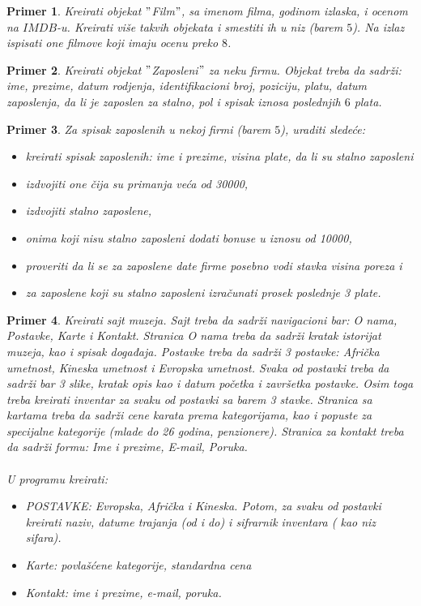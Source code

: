\documentclass[a4paper]{article}
\newtheorem{primer}{Primer}[section]
\begin{document}
\begin{primer}
Kreirati objekat $"$Film$"$, sa imenom filma, godinom izlaska, i ocenom na $IMDB$-u. Kreirati više takvih objekata i smestiti ih u niz (barem $5$). Na izlaz ispisati one filmove koji imaju ocenu preko $8$.  
\end{primer}

\begin{primer}
Kreirati objekat $"$Zaposleni$"$ za neku firmu. Objekat treba da sadrži: ime, prezime, datum rodjenja, identifikacioni broj, poziciju, platu, datum zaposlenja, da li je zaposlen za stalno, pol i spisak iznosa poslednjih $6$ plata.
\end{primer}

\begin{primer}
Za spisak zaposlenih u nekoj firmi (barem $5$), uraditi sledeće:
\begin{itemize}
	\item kreirati spisak zaposlenih: ime i prezime, visina plate, da li su stalno zaposleni
	\item izdvojiti one čija su primanja veća od 30000,
	\item izdvojiti stalno zaposlene,
	\item onima koji nisu stalno zaposleni dodati bonuse u iznosu od 10000,	
	\item proveriti da li se za zaposlene date firme posebno vodi stavka visina poreza i
	\item za zaposlene koji su stalno zaposleni izračunati prosek poslednje 3 plate.
\end{itemize}

\end{primer}

\begin{primer}
Kreirati sajt muzeja. Sajt treba da sadrži navigacioni bar: O nama, Postavke, Karte i Kontakt. Stranica O nama treba da sadrži kratak istorijat muzeja, kao i spisak događaja. Postavke treba da sadrži 3 postavke: Afrička umetnost, Kineska umetnost i Evropska umetnost. Svaka od postavki treba da sadrži bar 3 slike, kratak opis kao i datum početka i završetka postavke. Osim toga treba kreirati inventar za svaku od postavki sa barem 3 stavke. Stranica sa kartama treba da sadrži cene karata prema kategorijama, kao i popuste za specijalne kategorije (mlade do 26 godina, penzionere). Stranica za kontakt treba da sadrži formu: Ime i prezime, E-mail, Poruka.\\\\
U programu kreirati:
\begin{itemize}
\item POSTAVKE: Evropska, Afrička i Kineska. Potom, za svaku od postavki kreirati naziv, datume trajanja (od i do) i sifrarnik inventara ( kao niz sifara).
\item Karte: povlašćene kategorije, standardna cena
\item Kontakt: ime i prezime, e-mail, poruka.
\end{itemize}  
\end{primer}
\end{document}
